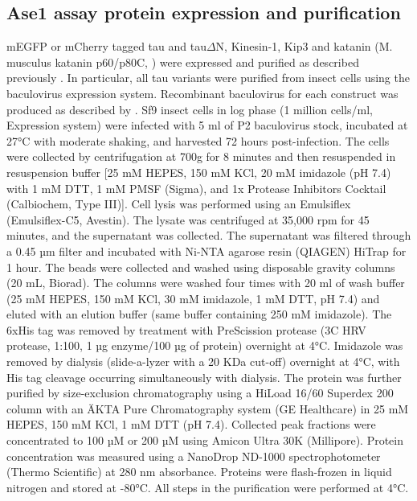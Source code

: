 \subsection{Ase1 assay protein expression and purification} 
mEGFP or mCherry tagged tau and tau$\Delta$N, Kinesin-1, Kip3 and katanin (M. musculus katanin p60/p80C, \cite{Jiang2017}) were expressed and purified as described previously \parencite{HERNANDEZVEGA20172304,Herrmann2018,Mitra2018,NITZSCHE2010247}. In particular, all tau variants  were purified from insect cells using the baculovirus expression system. Recombinant baculovirus for each construct was produced as described by \cite{woodruff2015method}. Sf9 insect cells in log phase (1 million cells/ml, Expression system) were infected with 5 ml of P2 baculovirus stock, incubated at 27°C with moderate shaking, and harvested 72 hours post-infection. The cells were collected by centrifugation at 700g for 8 minutes and then resuspended in resuspension buffer [25 mM HEPES, 150 mM KCl, 20 mM imidazole (pH 7.4) with 1 mM DTT, 1 mM PMSF (Sigma), and 1x Protease Inhibitors Cocktail (Calbiochem, Type III)]. Cell lysis was performed using an Emulsiflex (Emulsiflex-C5, Avestin). The lysate was centrifuged at 35,000 rpm for 45 minutes, and the supernatant was collected. The supernatant was filtered through a 0.45 µm filter and incubated with Ni-NTA agarose resin (QIAGEN) HiTrap for 1 hour. The beads were collected and washed using disposable gravity columns (20 mL, Biorad). The columns were washed four times with 20 ml of wash buffer (25 mM HEPES, 150 mM KCl, 30 mM imidazole, 1 mM DTT, pH 7.4) and eluted with an elution buffer (same buffer containing 250 mM imidazole). The 6xHis tag was removed by treatment with PreScission protease (3C HRV protease, 1:100, 1 µg enzyme/100 µg of protein) overnight at 4°C. Imidazole was removed by dialysis (slide-a-lyzer with a 20 KDa cut-off) overnight at 4°C, with His tag cleavage occurring simultaneously with dialysis. The protein was further purified by size-exclusion chromatography using a HiLoad 16/60 Superdex 200 column with an ÄKTA Pure Chromatography system (GE Healthcare) in 25 mM HEPES, 150 mM KCl, 1 mM DTT (pH 7.4). Collected peak fractions were concentrated to 100 µM or 200 µM using Amicon Ultra 30K (Millipore). Protein concentration was measured using a NanoDrop ND-1000 spectrophotometer (Thermo Scientific) at 280 nm absorbance. Proteins were flash-frozen in liquid nitrogen and stored at -80°C. All steps in the purification were performed at 4°C. 

